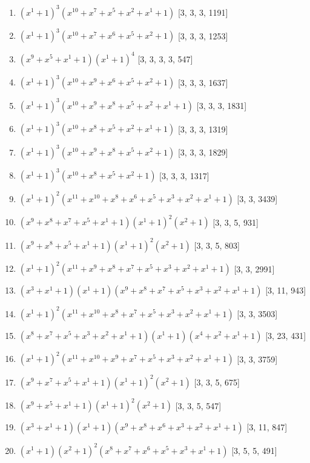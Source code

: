 \documentclass[10pt,twocolumn]{article}
\begin{document}
\begin{enumerate}
\item $(x^{1} + 1)^{3}(x^{10} + x^{7} + x^{5} + x^{2} + x^{1} + 1)$  [3, 3, 3, 1191]
\item $(x^{1} + 1)^{3}(x^{10} + x^{7} + x^{6} + x^{5} + x^{2} + 1)$  [3, 3, 3, 1253]
\item $(x^{9} + x^{5} + x^{1} + 1)(x^{1} + 1)^{4}$  [3, 3, 3, 3, 547]
\item $(x^{1} + 1)^{3}(x^{10} + x^{9} + x^{6} + x^{5} + x^{2} + 1)$  [3, 3, 3, 1637]
\item $(x^{1} + 1)^{3}(x^{10} + x^{9} + x^{8} + x^{5} + x^{2} + x^{1} + 1)$  [3, 3, 3, 1831]
\item $(x^{1} + 1)^{3}(x^{10} + x^{8} + x^{5} + x^{2} + x^{1} + 1)$  [3, 3, 3, 1319]
\item $(x^{1} + 1)^{3}(x^{10} + x^{9} + x^{8} + x^{5} + x^{2} + 1)$  [3, 3, 3, 1829]
\item $(x^{1} + 1)^{3}(x^{10} + x^{8} + x^{5} + x^{2} + 1)$  [3, 3, 3, 1317]
\item $(x^{1} + 1)^{2}(x^{11} + x^{10} + x^{8} + x^{6} + x^{5} + x^{3} + x^{2} + x^{1} + 1)$  [3, 3, 3439]
\item $(x^{9} + x^{8} + x^{7} + x^{5} + x^{1} + 1)(x^{1} + 1)^{2}(x^{2} + 1)$  [3, 3, 5, 931]
\item $(x^{9} + x^{8} + x^{5} + x^{1} + 1)(x^{1} + 1)^{2}(x^{2} + 1)$  [3, 3, 5, 803]
\item $(x^{1} + 1)^{2}(x^{11} + x^{9} + x^{8} + x^{7} + x^{5} + x^{3} + x^{2} + x^{1} + 1)$  [3, 3, 2991]
\item $(x^{3} + x^{1} + 1)(x^{1} + 1)(x^{9} + x^{8} + x^{7} + x^{5} + x^{3} + x^{2} + x^{1} + 1)$  [3, 11, 943]
\item $(x^{1} + 1)^{2}(x^{11} + x^{10} + x^{8} + x^{7} + x^{5} + x^{3} + x^{2} + x^{1} + 1)$  [3, 3, 3503]
\item $(x^{8} + x^{7} + x^{5} + x^{3} + x^{2} + x^{1} + 1)(x^{1} + 1)(x^{4} + x^{2} + x^{1} + 1)$  [3, 23, 431]
\item $(x^{1} + 1)^{2}(x^{11} + x^{10} + x^{9} + x^{7} + x^{5} + x^{3} + x^{2} + x^{1} + 1)$  [3, 3, 3759]
\item $(x^{9} + x^{7} + x^{5} + x^{1} + 1)(x^{1} + 1)^{2}(x^{2} + 1)$  [3, 3, 5, 675]
\item $(x^{9} + x^{5} + x^{1} + 1)(x^{1} + 1)^{2}(x^{2} + 1)$  [3, 3, 5, 547]
\item $(x^{3} + x^{1} + 1)(x^{1} + 1)(x^{9} + x^{8} + x^{6} + x^{3} + x^{2} + x^{1} + 1)$  [3, 11, 847]
\item $(x^{1} + 1)(x^{2} + 1)^{2}(x^{8} + x^{7} + x^{6} + x^{5} + x^{3} + x^{1} + 1)$  [3, 5, 5, 491]

\end{enumerate}
\end{document}
